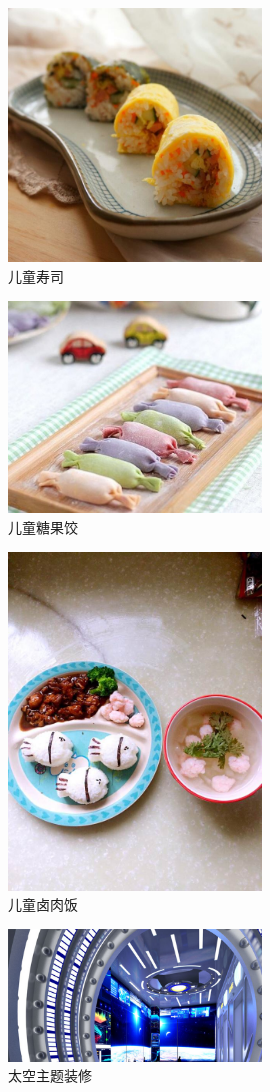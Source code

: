 \begin{figure}[htbp]
        \centering
        \caption{儿童寿司}
        \includegraphics[width=0.6\textwidth, height=0.4\textwidth]
        {../images/food/儿童寿司}
\end{figure}
\begin{figure}[htbp]
        \centering
        \caption{儿童糖果饺}
        \includegraphics[width=0.6\textwidth, height=0.4\textwidth]
        {../images/food/儿童糖果饺}
\end{figure}
\begin{figure}[htbp]
        \centering
        \caption{儿童卤肉饭}
        \includegraphics[width=0.6\textwidth, height=0.4\textwidth]{../images/food/卤肉饭}
\end{figure}
\begin{figure}[htbp]
        \centering
        \caption{太空主题装修}
        \includegraphics[width=0.6\textwidth]{../images/interior/太空}
\end{figure}
